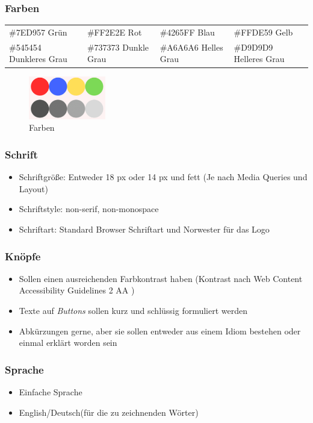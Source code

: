 \documentclass[11pt]{article}
\begin{document}
\subsubsection{Farben}

\begin{tabular}{llll}
\#7ED957    Grün & \#FF2E2E    Rot & \#4265FF    Blau & \#FFDE59    Gelb \\
\#545454    Dunkleres Grau & \#737373    Dunkle Grau & \#A6A6A6    Helles Grau & \#D9D9D9    Helleres Grau\\
\end{tabular}

\begin{figure}[ht]
\centering
\includegraphics[width=0.3\textwidth]{images/colors.png}
\caption{\label{fig:colors}Farben}
\end{figure}

\subsubsection{Schrift}
\begin{itemize}
\item Schriftgröße: Entweder 18 px oder 14 px und fett (Je nach Media Queries und Layout)
\item Schriftstyle: non-serif, non-monospace
\item Schriftart: Standard Browser Schriftart und Norwester für das Logo
\end{itemize}

\subsubsection{Knöpfe}
\begin{itemize}
\item Sollen einen ausreichenden Farbkontrast haben (Kontrast nach Web Content Accessibility Guidelines 2 AA \parencite{Caldwell2008})
\item Texte auf \textit{Buttons} sollen kurz und schlüssig formuliert werden
\item Abkürzungen gerne, aber sie sollen entweder aus einem Idiom bestehen oder einmal erklärt worden sein
\end{itemize}

\subsubsection{Sprache}
\begin{itemize}
\item Einfache Sprache
\item English/Deutsch(für die zu zeichnenden Wörter)
\end{itemize}

\pagebreak
\printbibliography
\end{document}
